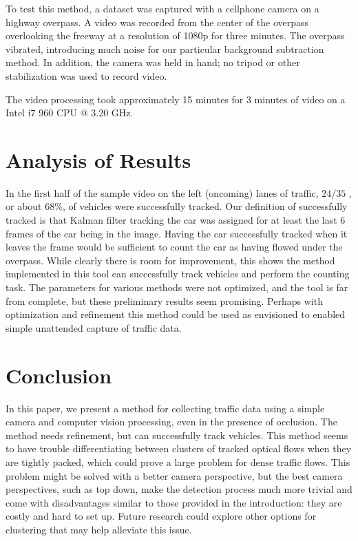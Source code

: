 \documentclass{article} %
\begin{document}
To test this method, a dataset was captured with a cellphone camera on a highway overpass. A video was recorded from the center of the overpass overlooking the freeway at a resolution of 1080p for three minutes. The overpass vibrated, introducing much noise for our particular background subtraction method. In addition, the camera was held in hand; no tripod or other stabilization was used to record video.

The video processing took approximately 15 minutes for 3 minutes of video on a Intel i7 960 CPU @ 3.20 GHz.



\section{Analysis of Results}
\label{sec:analysis}

In the first half of the sample video on the left (oncoming) lanes of traffic, $24/35$ , or about 68\%, of vehicles were successfully tracked. Our definition of successfully tracked is that Kalman filter tracking the car was assigned for at least the last 6 frames of the car being in the image. Having the car successfully tracked when it leaves the frame would be sufficient to count the car as having flowed under the overpass.  While clearly there is room for improvement, this shows the method implemented in this tool can successfully track vehicles and perform the counting task. The parameters for various methods were not optimized, and the tool is far from complete, but these preliminary results seem promising. Perhaps with optimization and refinement this method could be used as envisioned to enabled simple unattended capture of traffic data.


\section{Conclusion}
\label{sec:conclusion}

In this paper, we present a method for collecting traffic data using a simple camera and computer vision processing, even in the presence of occlusion. The method needs refinement, but can successfully track vehicles. This method seems to have trouble differentiating between clusters of tracked optical flows when they are tightly packed, which could prove a large problem for dense traffic flows. This problem might be solved with a better camera perspective, but the best camera perspectives, such as top down, make the detection process much more trivial and come with disadvantages similar to those provided in the introduction: they are costly and hard to set up. Future research could explore other options for clustering that may help alleviate this issue. 
\end{document}
